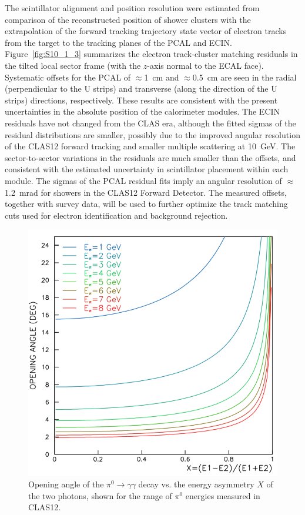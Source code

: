 The scintillator alignment and position resolution were estimated from comparison of the reconstructed position of
shower clusters with the extrapolation of the forward tracking trajectory state vector of electron tracks from the
target to the tracking planes of the PCAL and ECIN. Figure~\ref{fig:S10_1_3} summarizes the electron
track-cluster matching residuals in the tilted local sector frame (with the $z$-axis normal to the ECAL face).
Systematic offsets for the PCAL of $\approx$1~cm and $\approx$0.5~cm are seen in the radial (perpendicular to
the U strips) and transverse (along the direction of the U strips) directions, respectively. These results are
consistent with the present uncertainties in the absolute position of the calorimeter modules. The ECIN residuals
have not changed from the CLAS era, although the fitted sigmas of the residual distributions are smaller, possibly
due to the improved angular resolution of the CLAS12 forward tracking and smaller multiple scattering at 10~GeV.
The sector-to-sector variations in the residuals are much smaller than the offsets, and consistent with the
estimated uncertainty in scintillator placement within each module. The sigmas of the PCAL residual fits imply an
angular resolution of $\approx$1.2~mrad for showers in the CLAS12 Forward Detector. The measured offsets,
together with survey data, will be used to further optimize the track matching cuts used for electron identification
and background rejection. 

\begin{figure}[t]
\centering
\includegraphics[width=0.8\columnwidth,keepaspectratio]{img/opa.png}
\caption[]{Opening angle of the $\pi^0 \to \gamma \gamma$ decay vs. the energy asymmetry $X$ of
  the two photons, shown for the range of $\pi^0$ energies measured in CLAS12.}
\label{fig:opa}
\end{figure}

